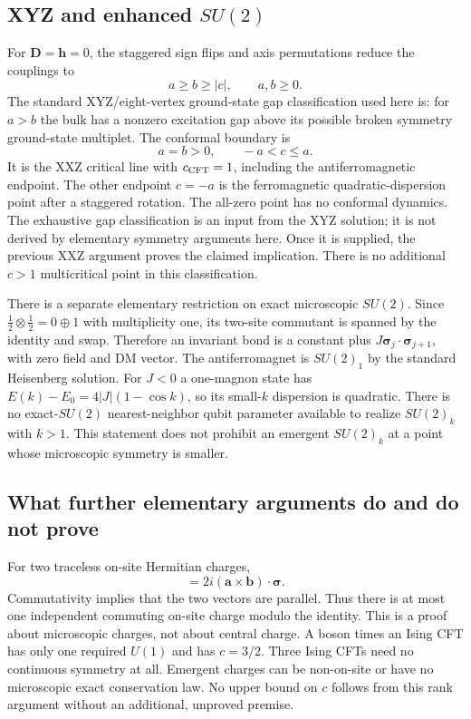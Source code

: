 \documentclass[11pt]{article}
\newcommand{\DD}{\boldsymbol D}
\newcommand{\hh}{\boldsymbol h}
\newcommand{\ssigma}{\boldsymbol\sigma}
\begin{document}
\subsection{XYZ and enhanced $SU(2)$}

For $\DD=\hh=0$, the staggered sign flips and axis permutations reduce the
couplings to
\begin{equation}
 a\ge b\ge |c|,\qquad a,b\ge0.
\end{equation}
The standard XYZ/eight-vertex ground-state gap classification used here is:
for $a>b$ the bulk has a nonzero excitation gap above its possible broken
symmetry ground-state multiplet. The conformal boundary is
\begin{equation}
 a=b>0,\qquad -a<c\le a.
\end{equation}
It is the XXZ critical line with $c_{\rm CFT}=1$, including the
antiferromagnetic endpoint. The other endpoint $c=-a$ is the ferromagnetic
quadratic-dispersion point after a staggered rotation. The all-zero point has
no conformal dynamics. The exhaustive gap classification is an input from
the XYZ solution; it is not derived by elementary symmetry arguments here.
Once it is supplied, the previous XXZ argument proves the claimed implication.
There is no additional $c>1$ multicritical point in this classification.

There is a separate elementary restriction on exact microscopic $SU(2)$.
Since $\tfrac12\otimes\tfrac12=0\oplus1$ with multiplicity one, its two-site
commutant is spanned by the identity and swap. Therefore an invariant bond
is a constant plus $J\ssigma_j\cdot\ssigma_{j+1}$, with zero field and DM
vector. The antiferromagnet is $SU(2)_1$ by the standard Heisenberg solution.
For $J<0$ a one-magnon state has
$E(k)-E_0=4|J|(1-\cos k)$, so its small-$k$ dispersion is quadratic.
There is no exact-$SU(2)$ nearest-neighbor qubit parameter available to realize
$SU(2)_k$ with $k>1$. This statement does not prohibit an emergent $SU(2)_k$
at a point whose microscopic symmetry is smaller.

\subsection{What further elementary arguments do and do not prove}

For two traceless on-site Hermitian charges,
\begin{equation}
 [\boldsymbol a\cdot\ssigma,\boldsymbol b\cdot\ssigma]
 =2i(\boldsymbol a\mathbin{\times}\boldsymbol b)\cdot\ssigma.
\end{equation}
Commutativity implies that the two vectors are parallel. Thus there is at
most one independent commuting on-site charge modulo the identity. This is
a proof about microscopic charges, not about central charge. A boson times
an Ising CFT has only one required $U(1)$ and has $c=3/2$. Three Ising CFTs
need no continuous symmetry at all. Emergent charges can be non-on-site or
have no microscopic exact conservation law. No upper bound on $c$ follows
from this rank argument without an additional, unproved premise.
\end{document}

